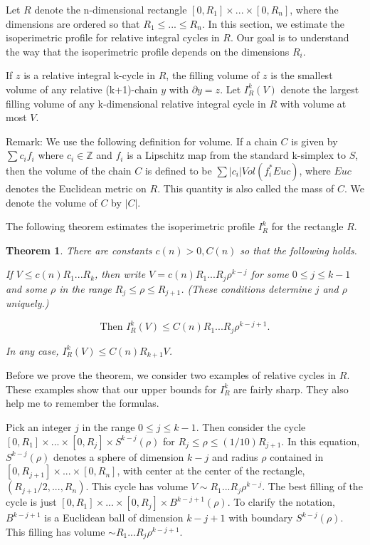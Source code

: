 \documentclass{amsart}
\newtheorem*{Theorem 1}{Theorem 1}
\newtheorem*{Theorem 2}{Theorem 2}
\newtheorem*{Estimate 1}{Estimate 1}
\newtheorem*{Estimate 2}{Estimate 2}
\newtheorem*{key lemma}{Key Lemma}
\newtheorem{theorem}{Theorem}
\numberwithin{equation}{section}
\begin{document}
Let $R$ denote the n-dimensional rectangle $[0, R_1] \times ...
\times [0, R_n]$, where the dimensions are ordered so that $R_1
\le ... \le R_n$. In this section, we estimate the isoperimetric
profile for relative integral cycles in $R$.  Our goal is to
understand the way that the isoperimetric profile depends on the
dimensions $R_i$.

If $z$ is a relative integral k-cycle in $R$, the filling volume
of $z$ is the smallest volume of any relative (k+1)-chain $y$
with $\partial y = z$.  Let $I^k_R(V)$ denote the largest filling
volume of any k-dimensional relative integral cycle in $R$ with
volume at most $V$.

Remark: We use the following definition for volume.  If a chain
$C$ is given by $\sum c_i f_i$ where $c_i \in \mathbb{Z}$ and
$f_i$ is a Lipschitz map from the standard k-simplex to $S$, then
the volume of the chain $C$ is defined to be $\sum |c_i|
Vol(f_i^* Euc)$, where $Euc$ denotes the Euclidean metric on $R$. 
This quantity is also called the mass of $C$.  We denote the
volume of $C$ by $|C|$.

The following theorem estimates the isoperimetric profile $I^k_R$ for
the rectangle $R$.

\begin{theorem} There are constants $c(n) > 0, C(n)$ so that the
following holds.

If $V \le c(n) R_1 ... R_k$, then write $V = c(n) R_1 ... R_j
\rho^{k-j}$ for some $0 \le j \le k-1$ and some $\rho$ in the
range $R_j \le \rho \le R_{j+1}$. (These conditions determine $j$
and $\rho$ uniquely.)

$$\textrm{Then } I^k_R(V) \le C(n) R_1 ... R_j \rho^{k-j+1}.$$

In any case, $I^k_R(V) \le C(n) R_{k+1} V$.

\end{theorem}

Before we prove the theorem, we consider two examples of relative
cycles in $R$.  These examples show that our upper bounds for
$I^k_R$ are fairly sharp.  They also help me to remember the
formulas.

Pick an integer $j$ in the range $0 \le j \le k-1$.  Then
consider the cycle $[0, R_1] \times ... \times [0, R_j]
\times S^{k-j}(\rho)$ for $R_j \le \rho
\le (1/10) R_{j+1}$.  In this equation, $S^{k-j}(\rho)$ denotes a
sphere of dimension $k-j$ and radius $\rho$ contained in $[0,
R_{j+1}] \times ... \times [0, R_n]$, with center at the center
of the rectangle, $(R_{j+1}/2, ..., R_n)$.  This cycle has volume
$V \sim R_1 ... R_j \rho^{k-j}$.  The best filling of the cycle
is just $[0, R_1] \times ... \times [0, R_j]
\times B^{k-j+1}(\rho)$.  To clarify the notation, $B^{k-j+1}$ is
a Euclidean ball of dimension $k-j+1$ with boundary
$S^{k-j}(\rho)$.  This filling has volume $\sim R_1... R_j
\rho^{k-j+1}$.
\end{document}
